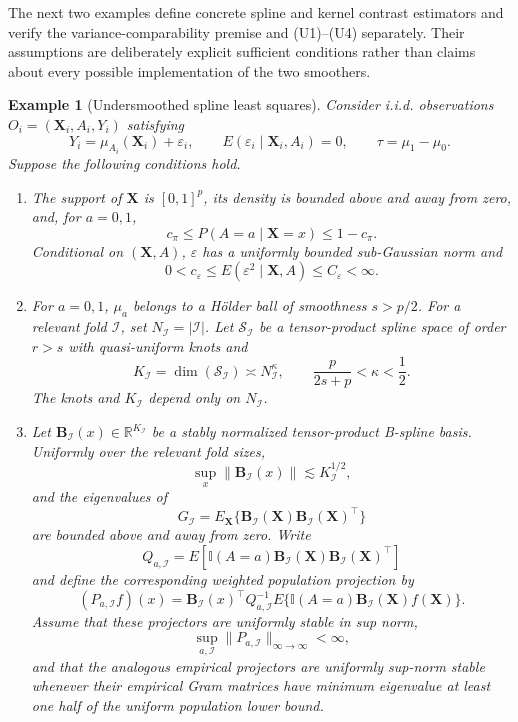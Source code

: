 \documentclass[11pt]{article}
\theoremstyle{referenceplain}
\theoremstyle{referencedefinition}
\newtheorem{example}{Example}
\theoremstyle{referenceremark}
\begin{document}
The next two examples define concrete spline and kernel contrast estimators and verify the variance-comparability premise and (U1)--(U4) separately. Their assumptions are deliberately explicit sufficient conditions rather than claims about every possible implementation of the two smoothers.

\begin{example}[Undersmoothed spline least squares]
\label{example:undersmoothed-spline}
Consider i.i.d. observations $O_i=(\mathbf X_i,A_i,Y_i)$ satisfying
\[
Y_i=\mu_{A_i}(\mathbf X_i)+\varepsilon_i,
\qquad
E(\varepsilon_i\mid \mathbf X_i,A_i)=0,
\qquad
\tau=\mu_1-\mu_0.
\]
Suppose the following conditions hold.
\begin{enumerate}
\item[\textup{(S1)}] The support of $\mathbf X$ is $[0,1]^p$, its density is bounded above and away from zero, and, for $a=0,1$,
\[
c_\pi\le P(A=a\mid\mathbf X=x)\le1-c_\pi.
\]
Conditional on $(\mathbf X,A)$, $\varepsilon$ has a uniformly bounded sub-Gaussian norm and
\[
0<c_\varepsilon
\le E(\varepsilon^2\mid\mathbf X,A)
\le C_\varepsilon<\infty.
\]
\item[\textup{(S2)}] For $a=0,1$, $\mu_a$ belongs to a H\"older ball of smoothness $s>p/2$. For a relevant fold $\mathcal I$, set $N_{\mathcal I}=|\mathcal I|$. Let $\mathcal S_{\mathcal I}$ be a tensor-product spline space of order $r>s$ with quasi-uniform knots and
\[
K_{\mathcal I}=\dim(\mathcal S_{\mathcal I})
\asymp N_{\mathcal I}^{\kappa},
\qquad
\frac{p}{2s+p}<\kappa<\frac12.
\]
The knots and $K_{\mathcal I}$ depend only on $N_{\mathcal I}$.
\item[\textup{(S3)}] Let $\mathbf B_{\mathcal I}(x)\in\mathbb R^{K_{\mathcal I}}$ be a stably normalized tensor-product B-spline basis. Uniformly over the relevant fold sizes,
\[
\sup_x\|\mathbf B_{\mathcal I}(x)\|
\lesssim K_{\mathcal I}^{1/2},
\]
and the eigenvalues of
\[
G_{\mathcal I}
=E_{\mathbf X}\{\mathbf B_{\mathcal I}(\mathbf X)
\mathbf B_{\mathcal I}(\mathbf X)^\top\}
\]
are bounded above and away from zero.
Write
\[
Q_{a,\mathcal I}
=E\left[\mathbb I(A=a)\mathbf B_{\mathcal I}(\mathbf X)
\mathbf B_{\mathcal I}(\mathbf X)^\top\right]
\]
and define the corresponding weighted population projection by
\[
(P_{a,\mathcal I}f)(x)
=\mathbf B_{\mathcal I}(x)^\top Q_{a,\mathcal I}^{-1}
E\{\mathbb I(A=a)\mathbf B_{\mathcal I}(\mathbf X)f(\mathbf X)\}.
\]
Assume that these projectors are
uniformly stable in sup norm,
\[
\sup_{a,\mathcal I}\|P_{a,\mathcal I}\|_{\infty\to\infty}<\infty,
\]
and that the analogous empirical projectors are uniformly sup-norm stable
whenever their empirical Gram matrices have minimum eigenvalue at least one
half of the uniform population lower bound.
\end{enumerate}


\end{example}
\end{document}

